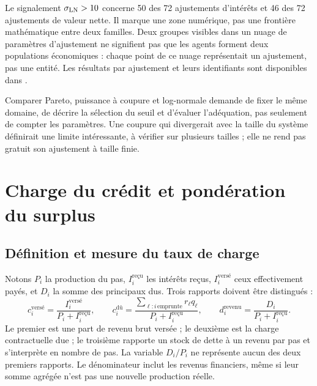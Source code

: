 Le signalement $\sigma_{\rm LN}>10$ concerne 50 des 72 ajustements
d'intérêts et 46 des 72 ajustements de valeur nette. Il marque une
zone numérique, pas une frontière mathématique entre deux familles.
Deux groupes visibles dans un nuage de paramètres d'ajustement ne
signifient pas que les agents forment deux populations économiques :
chaque point de ce nuage représentait un ajustement, pas une entité.
Les résultats par ajustement et leurs identifiants sont disponibles dans
.

Comparer Pareto, puissance à coupure et log-normale demande de
fixer le même domaine, de décrire la sélection du seuil et d'évaluer
l'adéquation, pas seulement de compter les paramètres. Une coupure
qui divergerait avec la taille du système définirait une limite
intéressante, à vérifier sur plusieurs tailles ; elle ne rend pas
gratuit son ajustement à taille finie.

\section{Charge du crédit et pondération du surplus}
\subsection{Définition et mesure du taux de charge}\label{sec:charge}
Notons $P_i$ la production du pas, $I_i^{\text{reçu}}$ les intérêts
reçus, $I_i^{\text{versé}}$ ceux effectivement payés, et $D_i$ la
somme des principaux dus. Trois rapports doivent être distingués :
\[
 c_i^{\text{versé}}=\frac{I_i^{\text{versé}}}{P_i+I_i^{\text{reçu}}},\qquad
 c_i^{\text{dû}}=\frac{\sum_{\ell:i\,\mathrm{emprunte}}r_\ell q_\ell}
                         {P_i+I_i^{\text{reçu}}},\qquad
 d_i^{\text{revenu}}=\frac{D_i}{P_i+I_i^{\text{reçu}}}.
\]
Le premier est une part de revenu brut versée ; le deuxième est la
charge contractuelle due ; le troisième rapporte un stock de dette
à un revenu par pas et s'interprète en nombre de pas. La
variable $D_i/P_i$ ne représente aucun des deux premiers rapports.
Le dénominateur inclut les revenus financiers, même si leur
somme agrégée n'est pas une nouvelle production réelle.


